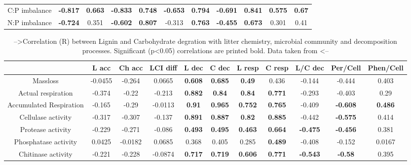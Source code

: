 \documentclass[authoryear,preprint,review,12pt]{elsarticle}
\begin{document}
\begin{table}[h!]
\begin{center}
{\begin{tabular}{ccccccccccc}
  C:P imbalance & \textbf{ -0.817 } & \textbf{ 0.663 } & \textbf{ -0.833 } & \textbf{ 0.748 } & \textbf{ -0.653 } & \textbf{ 0.794 } & \textbf{ -0.691 } & \textbf{ 0.841 } & \textbf{ 0.575 } & \textbf{ 0.67 } \\ 
  N:P imbalance & \textbf{ -0.724 } & 0.351 & \textbf{ -0.602 } & \textbf{ 0.807 } & -0.313 & \textbf{ 0.763 } & \textbf{ -0.455 } & \textbf{ 0.673 } & 0.301 & 0.41 \\ 
   \hline
\end{tabular}
}
\end{center}
\end{table}
\newpage
\begin{table}[h!]
\begin{center}
\caption{-->Correlation (R) between Lignin and Carbohydrate degration with litter chemistry, microbial community and decomposition processes. Significant (p<0.05) correlations are printed bold. Data taken from \cite{Mooshammer2011, Leitner2011}<--}
\label{corrtable2}
{\tiny
\begin{tabular}{ccccccccccc}
  \hline
 & L acc & Ch acc & LCI diff & L dec & C dec & L resp & C resp & L/C dec & Per/Cell & Phen/Cell \\ 
  \hline
Massloss & -0.0455 & -0.264 & 0.0665 & \textbf{ 0.608 } & \textbf{ 0.685 } & \textbf{ 0.49 } & 0.436 & -0.144 & -0.444 & 0.403 \\ 
  Actual respiration & -0.374 & -0.22 & -0.213 & \textbf{ 0.882 } & \textbf{ 0.84 } & \textbf{ 0.84 } & \textbf{ 0.771 } & -0.293 & -0.403 & 0.29 \\ 
  Accumulated Respiration & -0.165 & -0.29 & -0.0113 & \textbf{ 0.91 } & \textbf{ 0.965 } & \textbf{ 0.752 } & \textbf{ 0.765 } & -0.409 & \textbf{ -0.608 } & \textbf{ 0.486 } \\ 
  Cellulase activity & -0.317 & -0.307 & -0.137 & \textbf{ 0.891 } & \textbf{ 0.887 } & \textbf{ 0.82 } & \textbf{ 0.885 } & -0.442 & \textbf{ -0.575 } & 0.414 \\ 
  Protease activity & -0.229 & -0.271 & -0.086 & \textbf{ 0.493 } & \textbf{ 0.495 } & \textbf{ 0.463 } & \textbf{ 0.664 } & \textbf{ -0.475 } & \textbf{ -0.456 } & 0.381 \\ 
  Phosphatase activity & 0.0425 & -0.0182 & 0.0685 & 0.368 & 0.405 & 0.285 & \textbf{ 0.489 } & -0.408 & -0.152 & 0.0167 \\ 
  Chitinase activity & -0.221 & -0.228 & -0.0874 & \textbf{ 0.717 } & \textbf{ 0.719 } & \textbf{ 0.606 } & \textbf{ 0.771 } & \textbf{ -0.543 } & \textbf{ -0.58 } & 0.395 \\ 

\end{tabular}}
\end{center}
\end{table}
\end{document}
